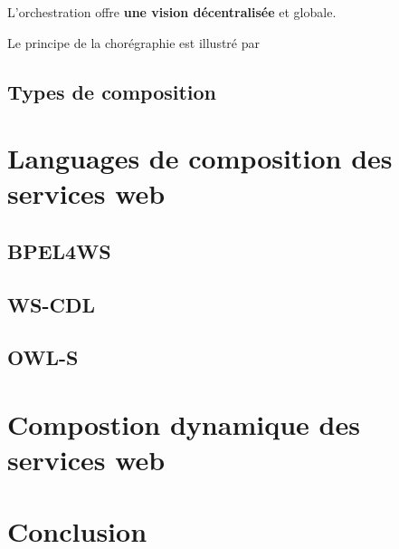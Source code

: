         L'orchestration offre \textbf{une vision décentralisée} et
        globale.

         Le principe de la chorégraphie est illustré par

      \subsection{Types de composition}
      \label{sec:types-de-composition}

  \section{Languages de composition des services web}
  \label{sec:lang-de-comp}

    \subsection{BPEL4WS}
    \label{sec:bpel4ws}

    \subsection{WS-CDL}
    \label{WS-CDL}

    \subsection{OWL-S}
    \label{sec:owl-s}


  \section{Compostion dynamique des services web}
  \label{sec:comp-dynam}
 
  \section{Conclusion}  
  \label{sec:conclusion}
 

